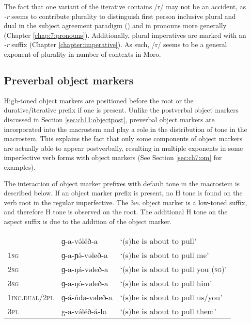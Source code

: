 The fact that one variant of the iterative contains /r/ may not be an accident, as \textit{-r} seems to contribute plurality to distinguish first person inclusive plural and dual in the subject agreement paradigm () and in pronouns more generally (Chapter \ref{chap:7:pronouns}). Additionally, plural imperatives are marked with an \textit{-r} suffix (Chapter \ref{chapter:imperative}). As such, /r/ seems to be a general exponent of plurality in number of contexts in Moro.

\subsection{Preverbal object markers}\label{sec:ch11:objectpre}

High-toned object markers are positioned before the root or the durative/iterative prefix if one is present. Unlike the postverbal object markers discussed in Section \ref{sec:ch11:objectpost}, preverbal object markers are incorporated into the macrostem and play a role in the distribution of tone in the macrostem. This explains the fact that only some components of object markers are actually able to appear postverbally, resulting in multiple exponents in some imperfective verb forms with object markers (See Section \ref{sec:ch7:om} for examples).  

The interaction of object marker prefixes with default tone in the macrostem is described below. If an object marker prefix is present, no H tone is found on the verb root in the regular imperfective. The \textsc{3pl} object marker is a low-toned suffix, and therefore H tone is observed on the root. The additional H tone on the aspect suffix is due to the addition of the object marker. 

\ea 
\begin{tabular}[t]{lll}
				&	ɡ-a-və́léð-a		&	‘(s)he is about to pull’\\
\textsc{1sg}	&	ɡ-a-ɲə́-vəleð-a	&	‘(s)he is about to pull me’\\
\textsc{2sg}	&	ɡ-a-ŋá-vəleð-a	&	‘(s)he is about to pull you (\textsc{sg})’\\
\textsc{3sg}	&	ɡ-a-ŋó-vəleð-a	&	‘(s)he is about to pull him’\\
\textsc{1inc.dual}/\textsc{2pl}	&	ɡ-á-ńdə-vəleð-a	&	‘(s)he is about to pull us/you’\\
\textsc{3pl}	&	g-a-və́léð-á-lo	&	‘(s)he is about to pull them’\\ 
\end{tabular}	
\z 

